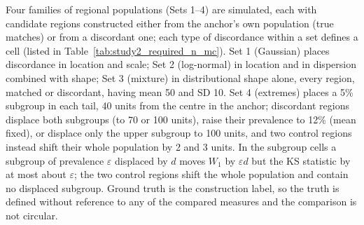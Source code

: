 \documentclass[AMA,Times1COL]{WileyNJDv5}
\begin{document}
Four families of regional populations (Sets 1--4) are simulated, each with candidate regions constructed either from the anchor's own population (true matches) or from a discordant one; each type of discordance within a set defines a cell (listed in Table~\ref{tab:study2_required_n_mc}). Set 1 (Gaussian) places discordance in location and scale; Set 2 (log-normal) in location and in dispersion combined with shape; Set 3 (mixture) in distributional shape alone, every region, matched or discordant, having mean 50 and SD 10. Set 4 (extremes) places a 5\% subgroup in each tail, 40 units from the centre in the anchor; discordant regions displace both subgroups (to 70 or 100 units), raise their prevalence to 12\% (mean fixed), or displace only the upper subgroup to 100 units, and two control regions instead shift their whole population by 2 and 3 units. In the subgroup cells a subgroup of prevalence $\varepsilon$ displaced by $d$ moves $W_1$ by $\varepsilon d$ but the KS statistic by at most about $\varepsilon$; the two control regions shift the whole population and contain no displaced subgroup. Ground truth is the construction label, so the truth is defined without reference to any of the compared measures and the comparison is not circular.
\end{document}
